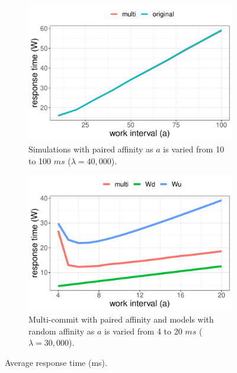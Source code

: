 \begin{figure}[h!tb]
    \centering
    \begin{subfigure}{0.49\textwidth}
        \includegraphics[width=\linewidth]{figures/fig-9a.pdf}
        \caption{Simulations with paired affinity as $a$ is varied from 10 to 100 $ms$ 
        ($\lambda = 40,000$).} \label{fig:9a}
    \end{subfigure}%
    \hspace*{\fill}   
    \begin{subfigure}{0.49\textwidth}
        \includegraphics[width=\linewidth]{figures/fig-9b.pdf}
        \caption{Multi-commit with paired affinity and models with random affinity as $a$ is varied from 4 to 20 $ms$ ($\lambda = 30,000$).} \label{fig:9b}
    \end{subfigure}
    \caption{Average response time (ms).} \label{fig:9}
\end{figure}
